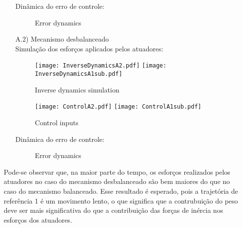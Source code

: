 \begin{itemize}
\begin{itemize}
Din\^amica do erro de controle:

\begin{figure}[H]
\centering
{}
\quad
{}
%
\caption{Error dynamics}
\label{fig:figure}
\end{figure}

\item[A.2)] Mecanismo desbalanceado \\

Simula\c{c}\~ao dos esfor\c{c}os aplicados pelos atuadores:

\begin{figure}[H]
\centering
\begin{minipage}[b]{0.45\linewidth}
\texttt{[image: InverseDynamicsA2.pdf]}
\texttt{[image: InverseDynamicsA1sub.pdf]}
\label{fig:InverseDynamicsA2}
\caption{Inverse dynamics simulation}
\end{minipage}
\quad
\begin{minipage}[b]{0.45\linewidth}
\texttt{[image: ControlA2.pdf]}
\texttt{[image: ControlA1sub.pdf]}
\label{fig:ControlA2}
\caption{Control inputs}
\end{minipage}
\end{figure}

Din\^amica do erro de controle:

\begin{figure}[H]
\centering
{}
\quad
{}
%
\caption{Error dynamics}
\label{fig:figure}
\end{figure}


\end{itemize}

Pode-se observar que, na maior parte do tempo, os esfor\c{c}os realizados pelos atuadores no caso do mecanismo desbalanceado s\~ao bem maiores do que no caso do mecanismo balanceado. Esse resultado \'e esperado, pois a trajet\'oria de refer\^encia 1 \'e um movimento lento, o que significa que a contrubui\c{c}\~ao do peso deve ser mais significativa do que a contribui\c{c}\~ao das for\c{c}as de in\'ercia nos esfor\c{c}os dos atuadores.



\end{itemize}
